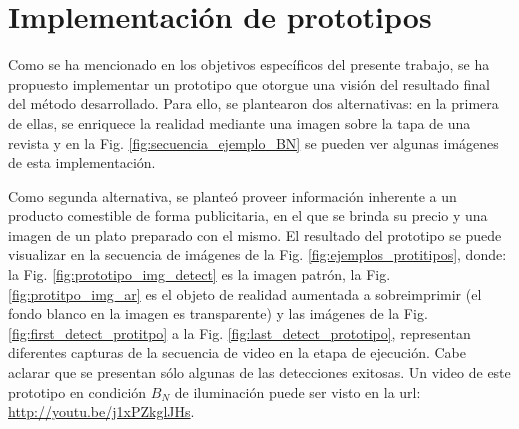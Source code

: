 \section{Implementación de prototipos}
Como se ha mencionado en los objetivos específicos del presente trabajo, se ha propuesto implementar un prototipo que otorgue una visión del resultado final del método desarrollado. Para ello, se plantearon dos alternativas: en la primera de ellas, se enriquece la realidad mediante una imagen sobre la tapa de una revista y en la Fig. \ref{fig:secuencia_ejemplo_BN} se pueden ver algunas imágenes de esta implementación.

Como segunda alternativa, se planteó proveer información inherente a un producto comestible de forma publicitaria, en el que se brinda su precio y una imagen de un plato preparado con el mismo. El resultado del prototipo se puede visualizar en la secuencia de imágenes de la Fig. \ref{fig:ejemplos_protitipos}, donde: la Fig. \ref{fig:prototipo_img_detect} es la imagen patrón, la Fig. \ref{fig:protitpo_img_ar} es el objeto de realidad aumentada a sobreimprimir (el fondo blanco en la imagen es transparente) y las imágenes de la Fig. \ref{fig:first_detect_protitpo} a la Fig. \ref{fig:last_detect_prototipo}, representan diferentes capturas de la secuencia de video en la etapa de ejecución. Cabe aclarar que se presentan sólo algunas de las detecciones exitosas. Un video de este prototipo en condición $B_{N}$ de iluminación puede ser visto en la url: \url{http://youtu.be/j1xPZkglJHs}.

